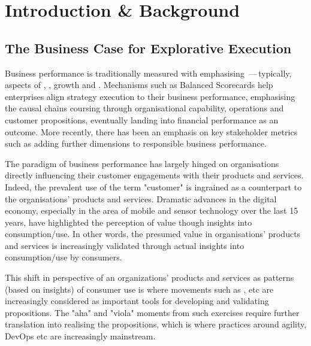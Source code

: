 \chapter*{Introduction \& Background}

\section*{The Business Case for Explorative Execution}

Business performance is traditionally measured with  emphasising
\,---\,typically, aspects of , , growth and .
Mechanisms such as Balanced Scorecards help enterprises align strategy execution to their
business performance, emphasising the causal chains coursing through organisational capability, operations and
customer propositions, eventually landing into financial performance as an outcome.
More recently, there has been an emphasis on key stakeholder metrics such as  adding further
dimensions to responsible business performance.

The paradigm of business performance has largely hinged on organisations directly influencing their customer
engagements with their products and services.
Indeed, the prevalent use of the term "customer" is ingrained as a counterpart to the organisations’
products and services.
Dramatic advances in the digital economy, especially in the area of mobile and sensor technology over the last 15 years,
have highlighted the perception of value though insights into consumption/use.
In other words, the presumed value in organisations’ products and services is increasingly validated through
actual insights into consumption/use by consumers.

This shift in perspective of an organizations’ products and services as patterns (based on insights) of consumer use
is where movements such as ,  etc are increasingly considered
as important tools for developing and validating propositions.
The "aha" and "viola" moments from such exercises require further translation into realising the propositions,
which is where practices around agility, DevOps etc are increasingly mainstream.

